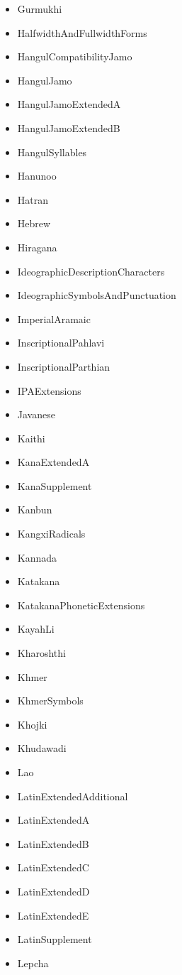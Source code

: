 ﻿\documentclass{article}
\newenvironment{itemlist}{%
  \begin{itemize}
	\setlength{\itemsep}{0pt}
	\setlength{\parsep}{0pt}
	\setlength{\topsep}{0pt}
	\setlength{\partopsep}{0pt}
	\setlength{\parskip}{0pt}
	\setlength{\labelsep}{5pt}}%
{
  \end{itemize}}
\begin{document}
\begin{multicols}{2}
\begin{itemlist}
				\item Gurmukhi
				\item HalfwidthAndFullwidthForms
				\item HangulCompatibilityJamo
				\item HangulJamo
				\item HangulJamoExtendedA
				\item HangulJamoExtendedB
				\item HangulSyllables
				\item Hanunoo
				\item Hatran
				\item Hebrew
				\item Hiragana
				\item IdeographicDescriptionCharacters
				\item IdeographicSymbolsAndPunctuation
				\item ImperialAramaic
				\item InscriptionalPahlavi
				\item InscriptionalParthian
				\item IPAExtensions
				\item Javanese
				\item Kaithi
				\item KanaExtendedA
				\item KanaSupplement
				\item Kanbun
				\item KangxiRadicals
				\item Kannada
				\item Katakana
				\item KatakanaPhoneticExtensions
				\item KayahLi
				\item Kharoshthi
				\item Khmer
				\item KhmerSymbols
				\item Khojki
				\item Khudawadi
				\item Lao
				\item LatinExtendedAdditional
				\item LatinExtendedA
				\item LatinExtendedB
				\item LatinExtendedC
				\item LatinExtendedD
				\item LatinExtendedE
				\item LatinSupplement
				\item Lepcha

\end{itemlist}
\end{multicols}
\end{document}
